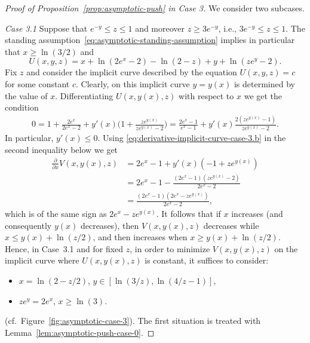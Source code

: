 \documentclass[a4paper]{amsart} %
\theoremstyle{definition}
\theoremstyle{remark}
\numberwithin{equation}{section}
\newcommand*{\XXXasymptoticDenominator}{V}
\newcommand*{\XXXasymptoticNominator}{U}
\begin{document}
\begin{proof}[Proof of Proposition~\ref{prop:asymptotic-push} in Case 3]
We consider two subcases.


\emph{Case 3.1}
	Suppose that $e^{-y} \leq z \leq 1$ and moreover $z\geq 3e^{-y}$,
	i.e., $3e^{-y} \leq z \leq 1$.
	The standing assumption~\eqref{eq:asymptotic-standing-assumption} implies in particular that
	$x\geq \ln(3/2)$ and
	\begin{equation*}
	\XXXasymptoticNominator(x,y,z) = x + \ln(2e^x-2) - \ln(2-z) + y + \ln(ze^{y} - 2) .
	\end{equation*}
	Fix $z$ and consider the implicit curve described by the equation $\XXXasymptoticNominator(x,y,z) = c$ for some constant $c$. 
	Clearly, on this implicit curve
	$y=y(x)$ is determined by the value of $x$.
	Differentiating $\XXXasymptoticNominator(x,y(x),z)$ with respect to $x$ we
	get the condition
	\begin{align}
	\label{eq:derivative-implicit-curve-case-3.b}
	0 = 1 + \frac{2e^{x}}{2e^{x} - 2} + y'(x)\bigl(1 + \frac{ze^{y(x)}}{ze^{y(x)} - 2}\bigr) =   \frac{2e^{x} - 1}{e^{x} - 1} + y'(x) \frac{2(ze^{y(x)} -1)}{ze^{y(x)} - 2}.
	\end{align}
	In particular, $y'(x)\leq 0$.
	Using \eqref{eq:derivative-implicit-curve-case-3.b} in the second inequality below we get
	\begin{align*}
	\frac{\partial}{\partial x} \XXXasymptoticDenominator(x, y(x), z) 
	&= 2e^{x} - 1  + y'(x)(-1  + z e^{y(x)}) \\
	&= 2e^{x} - 1 - \frac{(2e^x -1)(ze^{y(x)} - 2)}{2e^x - 2}\\
	&= \frac{(2e^x - 1)(2e^x - z e^{y(x)})}{2e^x  -2},
	\end{align*}
	which is of the same sign as $2e^x - ze^{y(x)}$.
	It follows that if $x$ increases (and consequently $y(x)$ decreases),
	then $\XXXasymptoticDenominator(x,y(x),z)$ decreases while $x \leq y(x) + \ln(z/2)$,
	and then increases when $x \geq y(x) + \ln(z/2)$.
	Hence, in Case~3.1 and for fixed $z$,  
	in order to minimize $\XXXasymptoticDenominator(x, y(x),z)$ on the implicit curve where $\XXXasymptoticNominator(x,y(x),z)$ is constant, it suffices to consider:
	\begin{itemize}
		\item $x=\ln(2-z/2)$, $y\in[\ln(3/z), \ln(4/z -1)]$,
		\item $ze^y = 2e^x$, $x\geq \ln(3)$.
	\end{itemize}
(cf.~Figure~\ref{fig:asymptotic-case-3}).
			The first situation is treated with Lemma~\ref{lem:asymptotic-push-case-0}. 

\end{proof}
\end{document}
